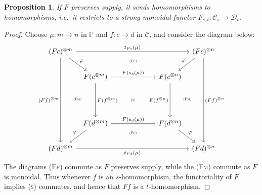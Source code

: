 \documentclass[11pt, oneside, article]{memoir}
\theoremstyle{plain}
\newtheorem{proposition}[theorem]{Proposition}
\theoremstyle{definition}
\theoremstyle{remark}
\newcommand{\cat}[1]{\mathcal{#1}}%
\newcommand{\tpow}[1]{^{\otimes #1}}
\newcommand{\pp}{\mathbb{P}}
\begin{document}
\begin{proposition}
If $F$ preserves supply, it sends homomorphisms to homomorphisms, i.e.\ it restricts to a strong monoidal functor $F_{s,t}\colon\cat{C}_s\to\cat{D}_t$.
\end{proposition}
\begin{proof}
Choose $\mu\colon m\to n$ in $\pp$ and $f\colon c\to d$ in $\cat{C}$, and consider the diagram below:
\[
\begin{tikzcd}[column sep=6pt]
	(Fc)\tpow{m}
		\ar[rrrr, "t_{Fc}(\mu)"]
		\ar[dddd, "(Ff)\tpow{m}"']
		\ar[dr, "\varphi"]
		&
    &[18pt] 
    \ar[d, phantom, near start,  "\textsc{\tiny (Fp)}"]
		&[18pt]
    &
  (Fc)\tpow{n}
		\ar[dddd, "(Ff)\tpow{n}"]
		\ar[dl, "\varphi"']
		\\
		&
	F(c\tpow{m})
		\ar[dd, "F(f\tpow{m})"]
    \ar[rr, "F(s_{c}(\mu))"]
    &
    ~
    &
	F(c\tpow{n})
    \ar[dd, "F(f\tpow{n})"']
    \\
    \ar[r, phantom,"\textsc{\tiny (Fm)}"]
    &~& 
    \textsc{\tiny (s)}
    &~&
    \ar[l, phantom,"\textsc{\tiny (Fm)}"]
		\\
		&
	F(d\tpow{m})
		\ar[rr, "F(s_d(\mu))"]
    \ar[dl, "\varphi"']
    &
    \ar[d, phantom, near start, "\textsc{\tiny (Fp)}"]
    &
	F(d\tpow{n})
    \ar[dr, "\varphi"]
    \\
	(Fd)\tpow{m}
		\ar[rrrr, "t_{Fd}(\mu)"']
		&&~&&
	(Fd)\tpow{n}
\end{tikzcd}
\]
The diagrams \textsc{(Fp)} commute as $F$ preserves supply, while the \textsc{(Fm)} commute as $F$ is monoidal. Thus whenever $f$ is an $s$-homomorphism, the functoriality of $F$ implies \textsc{(s)} commutes, and hence that $Ff$ is a $t$-homomorphism.
\end{proof}
\end{document}
